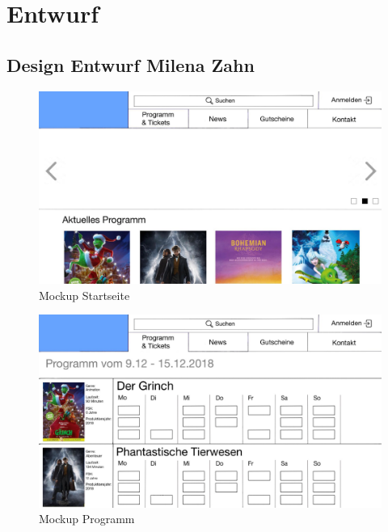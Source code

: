 \chapter{Entwurf}\label{entwurf}
	\section[Design Entwurf]{Design Entwurf {\hfill \normalsize Milena Zahn}}\label{design}
		\begin{figure}[H]
			\centering 
			\includegraphics[width=14cm]{img/mockUp1.png}
			\captionsetup{format=hang}
			\caption[Mockup Startseite]{\label{fig:mockUpStartseite} Mockup Startseite }
		\end{figure}
		\begin{figure}[H]
			\centering 
			\includegraphics[width=14cm]{img/mockUp2.png}
			\captionsetup{format=hang}
			\caption[Mockup Programm]{\label{fig:mockUpProgramm} Mockup Programm }
		\end{figure}
